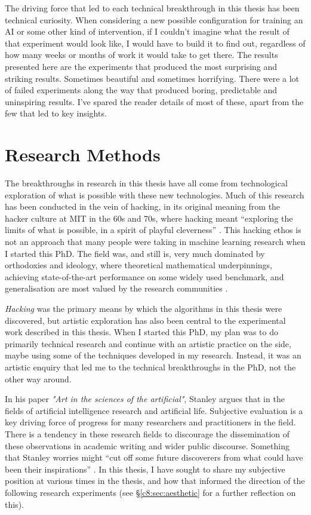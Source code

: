 The driving force that led to each technical breakthrough in this thesis has been technical curiosity. 
When considering a new possible configuration for training an AI or some other kind of intervention, if I couldn’t imagine what the result of that experiment would look like, I would have to build it to find out, regardless of how many weeks or months of work it would take to get there. 
The results presented here are the experiments that produced the most surprising and striking results. 
Sometimes beautiful and sometimes horrifying. 
There were a lot of failed experiments along the way that produced boring, predictable and uninspiring results. 
I’ve spared the reader details of most of these, apart from the few that led to key insights.

\section{Research Methods}

The breakthroughs in research in this thesis have all come from technological exploration of what is possible with these new technologies. Much of this research has been conducted in the vein of hacking, in its original meaning from the hacker culture at MIT in the 60s and 70s, where hacking meant “exploring the limits of what is possible, in a spirit of playful cleverness” \citep{stallman2002hacking}. 
This hacking ethos is not an approach that many people were taking in machine learning research when I started this PhD. 
The field was, and still is, very much dominated by orthodoxies and ideology, where theoretical mathematical underpinnings, achieving state-of-the-art performance on some widely used benchmark, and generalisation are most valued by the research communities \citep{birhane2022values}.

\textit{Hacking} was the primary means by which the algorithms in this thesis were discovered, but artistic exploration has also been central to the experimental work described in this thesis. 
When I started this PhD, my plan was to do primarily technical research and continue with an artistic practice on the side, maybe using some of the techniques developed in my research. 
Instead, it was an artistic enquiry that led me to the technical breakthroughs in the PhD, not the other way around. 

In his paper \textit{"Art in the sciences of the artificial"}, Stanley argues that in the fields of artificial intelligence research and artificial life. 
Subjective evaluation is a key driving force of progress for many researchers and practitioners in the field. 
There is a tendency in these research fields to discourage the dissemination of these observations in academic writing and wider public discourse. 
Something that Stanley worries might “cut off some future discoverers from what could have been their inspirations” \citep{stanley2018art}. 
In this thesis, I have sought to share my subjective position at various times in the thesis, and how that informed the direction of the following research experiments (see \S \ref{c8:sec:aesthetic} for a further reflection on this).

